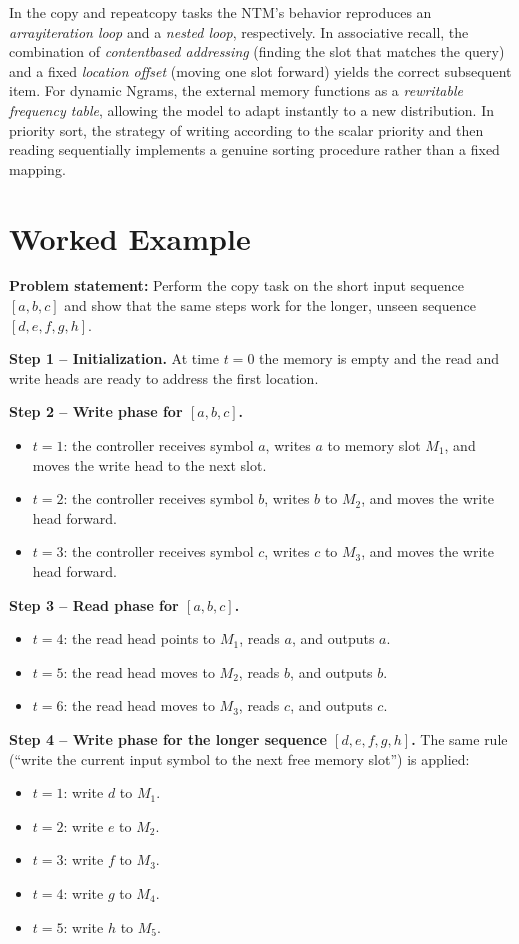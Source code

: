 \documentclass[12pt, a4paper]{article}
\begin{document}
{In the copy and repeatcopy tasks the NTM's behavior reproduces an \emph{arrayiteration loop} and a \emph{nested loop}, respectively.  In associative recall, the combination of \emph{contentbased addressing} (finding the slot that matches the query) and a fixed \emph{location offset} (moving one slot forward) yields the correct subsequent item.  For dynamic Ngrams, the external memory functions as a \emph{rewritable frequency table}, allowing the model to adapt instantly to a new distribution.  In priority sort, the strategy of writing according to the scalar priority and then reading sequentially implements a genuine sorting procedure rather than a fixed mapping.

\section{Worked Example}
\textbf{Problem statement:}  Perform the copy task on the short input sequence $[a,b,c]$ and show that the same steps work for the longer, unseen sequence $[d,e,f,g,h]$.

\textbf{Step 1 -- Initialization.}  
At time $t=0$ the memory is empty and the read and write heads are ready to address the first location.

\textbf{Step 2 -- Write phase for $[a,b,c]$.}  
\begin{itemize}
\item $t=1$: the controller receives symbol $a$, writes $a$ to memory slot $M_{1}$, and moves the write head to the next slot.
\item $t=2$: the controller receives symbol $b$, writes $b$ to $M_{2}$, and moves the write head forward.
\item $t=3$: the controller receives symbol $c$, writes $c$ to $M_{3}$, and moves the write head forward.
\end{itemize}

\textbf{Step 3 -- Read phase for $[a,b,c]$.}  
\begin{itemize}
\item $t=4$: the read head points to $M_{1}$, reads $a$, and outputs $a$.
\item $t=5$: the read head moves to $M_{2}$, reads $b$, and outputs $b$.
\item $t=6$: the read head moves to $M_{3}$, reads $c$, and outputs $c$.
\end{itemize}

\textbf{Step 4 -- Write phase for the longer sequence $[d,e,f,g,h]$.}  
The same rule (``write the current input symbol to the next free memory slot'') is applied:
\begin{itemize}
\item $t=1$: write $d$ to $M_{1}$.
\item $t=2$: write $e$ to $M_{2}$.
\item $t=3$: write $f$ to $M_{3}$.
\item $t=4$: write $g$ to $M_{4}$.
\item $t=5$: write $h$ to $M_{5}$.
\end{itemize}

}
\end{document}
